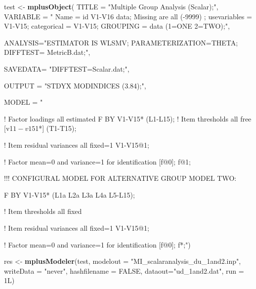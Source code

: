 \documentclass[]{book}
\newenvironment{Shaded}{\begin{snugshade}}{\end{snugshade}}
\newcommand{\DataTypeTok}[1]{\textcolor[rgb]{0.13,0.29,0.53}{#1}}
\newcommand{\KeywordTok}[1]{\textcolor[rgb]{0.13,0.29,0.53}{\textbf{#1}}}
\newcommand{\NormalTok}[1]{#1}
\newcommand{\OtherTok}[1]{\textcolor[rgb]{0.56,0.35,0.01}{#1}}
\newcommand{\StringTok}[1]{\textcolor[rgb]{0.31,0.60,0.02}{#1}}
\begin{document}
\begin{Shaded}
\begin{Highlighting}[]
\NormalTok{test <-}\StringTok{ }\KeywordTok{mplusObject}\NormalTok{(}
\DataTypeTok{TITLE =} \StringTok{"Multiple Group Analysis (Scalar);"}\NormalTok{,}
\DataTypeTok{VARIABLE =} \StringTok{"}
\StringTok{Name = id V1-V16 data;}
\StringTok{Missing are all (-9999) ;}
\StringTok{usevariables = V1-V15;}
\StringTok{categorical = V1-V15;}
\StringTok{GROUPING = data (1=ONE 2=TWO);"}\NormalTok{,}

\DataTypeTok{ANALYSIS=}\StringTok{"ESTIMATOR IS WLSMV; }
\StringTok{PARAMETERIZATION=THETA;}
\StringTok{DIFFTEST= MetricB.dat;"}\NormalTok{,}

\DataTypeTok{SAVEDATA=} \StringTok{"DIFFTEST=Scalar.dat;"}\NormalTok{,}

\DataTypeTok{OUTPUT =} \StringTok{"STDYX MODINDICES (3.84);"}\NormalTok{,}

\DataTypeTok{MODEL =} \StringTok{" }

\StringTok{! Factor loadings all estimated         }
\StringTok{ F BY V1-V15* (L1-L15);}
\StringTok{       }
\StringTok{! Item thresholds all free     }
\StringTok{[v1$1-v15$1*] (T1-T15);    }

\StringTok{! Item residual variances all fixed=1     }
\StringTok{V1-V15@1; }

\StringTok{! Factor mean=0 and variance=1 for identification }
\StringTok{[f@0]; f@1; }

\StringTok{!!! CONFIGURAL MODEL FOR ALTERNATIVE GROUP      }
\StringTok{MODEL TWO:        }

\StringTok{F BY V1-V15* (L1a L2a L3a L4a L5-L15);}

\StringTok{! Item thresholds all fixed   }

\StringTok{! Item residual variances all fixed=1     }
\StringTok{V1-V15@1; }

\StringTok{! Factor mean=0 and variance=1 for identification }
\StringTok{[f@0]; f*;"}\NormalTok{)}

\NormalTok{res <-}\StringTok{ }\KeywordTok{mplusModeler}\NormalTok{(test, }\DataTypeTok{modelout =} \StringTok{"MI_scalaranalysis_du_1and2.inp"}\NormalTok{, }
                    \DataTypeTok{writeData =} \StringTok{"never"}\NormalTok{, }
                    \DataTypeTok{hashfilename =} \OtherTok{FALSE}\NormalTok{, }
                    \DataTypeTok{dataout=}\StringTok{"ud_1and2.dat"}\NormalTok{, }\DataTypeTok{run =}\NormalTok{ 1L)}
\end{Highlighting}
\end{Shaded}
\end{document}
